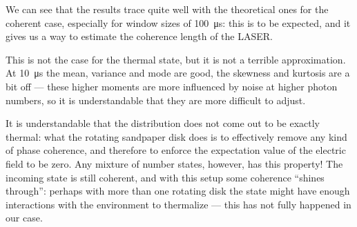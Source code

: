 \documentclass[main.tex]{subfiles}
\begin{document}
We can see that the results trace quite well with the theoretical ones for the coherent case, especially for window sizes of \SI{100}{\micro s}: this is to be expected, and it gives us a way to estimate the coherence length of the LASER. 

This is not the case for the thermal state, but it is not a terrible approximation. At \SI{10}{\micro s} the mean, variance and mode are good, the skewness and kurtosis are a bit off --- these higher moments are more influenced by noise at higher photon numbers, so it is understandable that they are more difficult to adjust. 

It is understandable that the distribution does not come out to be exactly thermal: what the rotating sandpaper disk does is to effectively remove any kind of phase coherence, and therefore to enforce the expectation value of the electric field to be zero. 
Any mixture of number states, however, has this property! 
The incoming state is still coherent, and with this setup some coherence ``shines through'': perhaps with more than one rotating disk the state might have enough interactions with the environment to thermalize --- this has not fully happened in our case. 
\end{document}

